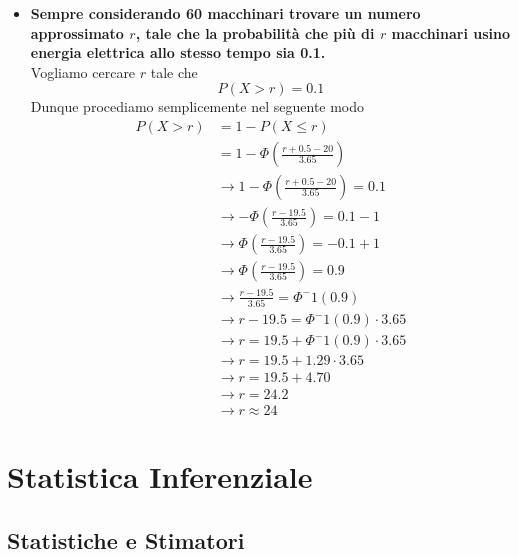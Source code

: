 \documentclass[11pt]{report}
\begin{document}
\begin{itemize}
\begin{equation}
	\end{equation}
	\item \textbf{Sempre considerando 60 macchinari trovare un numero approssimato $r$, tale che la probabilità che più di $r$ macchinari usino energia elettrica allo stesso tempo sia 0.1.}\\
	Vogliamo cercare $r$ tale che
	$$P(X > r) = 0.1$$
	Dunque procediamo semplicemente nel seguente modo
	\begin{equation}
    	\begin{split}
       		P(X > r) & = 1 - P(X \leq r)\\
       		& = 1 - \Phi \left( \frac{r + 0.5 - 20}{3.65} \right)\\
       		& \rightarrow 1 - \Phi \left( \frac{r + 0.5 - 20}{3.65} \right) = 0.1\\
       		& \rightarrow - \Phi \left( \frac{r - 19.5}{3.65} \right) = 0.1 - 1\\
       		& \rightarrow \Phi \left( \frac{r - 19.5}{3.65} \right) = - 0.1 + 1\\
       		& \rightarrow \Phi \left( \frac{r - 19.5}{3.65} \right) = 0.9\\
       		& \rightarrow \frac{r - 19.5}{3.65} = \Phi^-1 (0.9)\\
       		& \rightarrow r - 19.5 = \Phi^-1 (0.9) \cdot 3.65\\
       		& \rightarrow r = 19.5 + \Phi^-1 (0.9) \cdot 3.65\\
       		& \rightarrow r = 19.5 + 1.29 \cdot 3.65\\
       		& \rightarrow r = 19.5 + 4.70\\
       		& \rightarrow r = 24.2\\
       		& \rightarrow r \approx 24
    	\end{split}
	\end{equation}
\end{itemize}

\part{Statistica Inferenziale}

\chapter{Statistiche e Stimatori}
\end{document}
